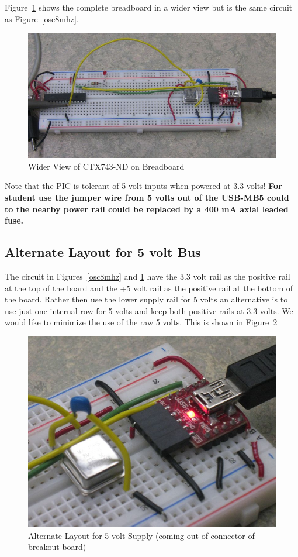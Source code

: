 \documentclass[twocolumn]{article}
\makeatletter
\def\maxwidth{\ifdim\Gin@nat@width>\linewidth\linewidth
\else\Gin@nat@width\fi}
\let\Oldincludegraphics\includegraphics
\renewcommand{\includegraphics}[1]{\Oldincludegraphics[width=\maxwidth]{#1}}
\makeatother
\begin{document}
Figure~\ref{osc8mhzwideview} shows the complete breadboard in a wider view but is the same circuit as Figure~\ref{osc8mhz}.

\begin{figure}[htbp]
\centering
\includegraphics{phys1600/pic_usb-mb5_8mhzosc.jpg}
\caption{Wider View of CTX743-ND on Breadboard}
\label{osc8mhzwideview}
\end{figure}

Note that the PIC is tolerant of 5 volt inputs when powered at 3.3
volts! \textbf{For student use the jumper wire from 5 volts out of the
USB-MB5 could to the nearby power rail could be replaced by a 400 mA
axial leaded fuse.}

\subsection{Alternate Layout for 5 volt Bus}

The circuit in Figures~\ref{osc8mhz} and \ref{osc8mhzwideview} have the 3.3 volt rail as the positive rail at the top of the board and the +5 volt rail as the positive rail at the bottom of the board. Rather then use the lower supply rail for 5 volts an alternative is to
use just one internal row for 5 volts and keep both positive rails at 3.3 volts.
We would like to minimize the use of the raw 5 volts. This is shown in Figure~\ref{osc8mhzalternate}

\begin{figure}[htbp]
\centering
\includegraphics{phys1600/alternative_5v_row2.jpg}
\caption{Alternate Layout for 5 volt Supply (coming out of connector of breakout board)}
\label{osc8mhzalternate}
\end{figure}
\end{document}
